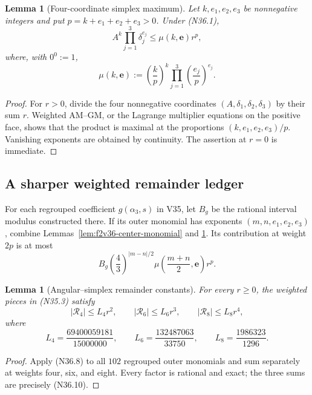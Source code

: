 \documentclass[11pt]{article}
\newtheorem{lemma}[theorem]{Lemma}
\theoremstyle{definition}
\theoremstyle{remark}
\begin{document}
\begin{lemma}[Four-coordinate simplex maximum]
\label{lem:f2v36-simplex-maximum}
Let \(k,e_1,e_2,e_3\) be nonnegative integers and put
\(p=k+e_1+e_2+e_3>0\).  Under \textup{(N36.1)},
\[
 A^k\prod_{j=1}^3\delta_j^{e_j}
 \leq
 \mu(k,\bm e)r^p,
\tag{N36.6}
\]
where, with \(0^0:=1\),
\[
 \mu(k,\bm e):=
 \left(\frac{k}{p}\right)^k
 \prod_{j=1}^3\left(\frac{e_j}{p}\right)^{e_j}.
\tag{N36.7}
\]
\end{lemma}

\begin{proof}
For \(r>0\), divide the four nonnegative coordinates
\((A,\delta_1,\delta_2,\delta_3)\) by their sum \(r\).  Weighted AM--GM,
or the Lagrange multiplier equations on the positive face, shows that the
product is maximal at the proportions
\((k,e_1,e_2,e_3)/p\).  Vanishing exponents are obtained by continuity.
The assertion at \(r=0\) is immediate.
\end{proof}

\subsection{A sharper weighted remainder ledger}

For each regrouped coefficient \(g(\alpha_3,s)\) in V35, let \(B_g\) be
the rational interval modulus constructed there.  If its outer monomial
has exponents \((m,n,e_1,e_2,e_3)\), combine
Lemmas~\ref{lem:f2v36-center-monomial} and
\ref{lem:f2v36-simplex-maximum}.  Its contribution at weight \(2p\) is at
most
\[
 B_g
 \left(\frac43\right)^{|m-n|/2}
 \mu\!\left(\frac{m+n}{2},\bm e\right)r^p.
\tag{N36.8}
\]

\begin{lemma}[Angular--simplex remainder constants]
\label{lem:f2v36-remainder}
For every \(r\geq0\), the weighted pieces in \textup{(N35.3)} satisfy
\[
 |\mathcal R_4|\leq L_4r^2,\qquad
 |\mathcal R_6|\leq L_6r^3,\qquad
 |\mathcal R_8|\leq L_8r^4,
\tag{N36.9}
\]
where
\[
 \boxed{
 L_4=\frac{69400059181}{15000000},\qquad
 L_6=\frac{132487063}{33750},\qquad
 L_8=\frac{1986323}{1296}.}
\tag{N36.10}
\]
\end{lemma}

\begin{proof}
Apply \textup{(N36.8)} to all \(102\) regrouped outer monomials and sum
separately at weights four, six, and eight.  Every factor is rational and
exact; the three sums are precisely \textup{(N36.10)}.
\end{proof}
\end{document}
